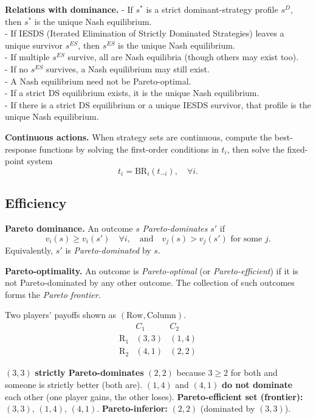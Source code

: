 \documentclass[11pt]{article}
\newcommand{\BR}{\mathrm{BR}}
\begin{document}
\begin{multicols}{2}
\textbf{Relations with dominance.}  
- If $s^*$ is a strict dominant-strategy profile $s^D$, then $s^*$ is the unique Nash equilibrium.  \\
- If IESDS (Iterated Elimination of Strictly Dominated Strategies) leaves a unique survivor $s^{ES}$, then $s^{ES}$ is the unique Nash equilibrium.  \\
- If multiple $s^{ES}$ survive, all are Nash equilibria (though others may exist too).  \\
- If no $s^{ES}$ survives, a Nash equilibrium may still exist.  \\
- A Nash equilibrium need not be Pareto-optimal.  \\
- If a strict DS equilibrium exists, it is the unique Nash equilibrium.\\
- If there is a strict DS equilibrium or a unique IESDS survivor, that profile is the unique Nash equilibrium.

\textbf{Continuous actions.}  
When strategy sets are continuous, compute the best-response functions by solving the first-order conditions in $t_i$, then solve the fixed-point system
\[
t_i = \BR_i(t_{-i}), \quad \forall i.
\]


\subsection*{Efficiency}

\textbf{Pareto dominance.}  
An outcome $s$ \emph{Pareto-dominates} $s'$ if
\[
v_i(s) \ge v_i(s') \quad \forall i,
\quad \text{and} \quad v_j(s) > v_j(s') \text{ for some } j.
\]
Equivalently, $s'$ is \emph{Pareto-dominated} by $s$.

\textbf{Pareto-optimality.}  
An outcome is \emph{Pareto-optimal} (or \emph{Pareto-efficient}) if it is not Pareto-dominated by any other outcome.  
The collection of such outcomes forms the \emph{Pareto frontier}.

Two players’ payoffs shown as $(\text{Row}, \text{Column})$.
\[
\begin{array}{c|cc}
    & C_1     & C_2     \\\hline
\text{R}_1 & (3,3)   & (1,4)   \\
\text{R}_2 & (4,1)   & (2,2)
\end{array}
\]

$(3,3)$ \textbf{strictly Pareto-dominates} $(2,2)$ because $3\geq 2$ for both and someone is strictly better (both are). $(1,4)$ and $(4,1)$ \textbf{do not dominate} each other (one player gains, the other loses). \textbf{Pareto-efficient set (frontier):} $(3,3)$, $(1,4)$, $(4,1)$. \textbf{Pareto-inferior:} $(2,2)$ (dominated by $(3,3)$).




\end{multicols}
\end{document}

